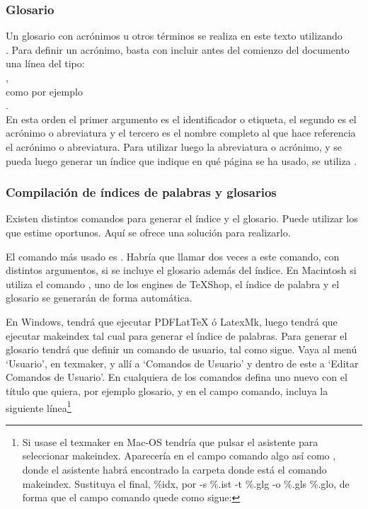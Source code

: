 \subsubsection{Glosario}
Un glosario con acrónimos u otros términos se realiza en este texto utilizando\\
 . 
 Para definir un acrónimo, basta con incluir antes del comienzo del documento una línea del tipo:\\
 , 
 \\
 como por ejemplo\\
 . 
 \\
 En esta orden el primer argumento es el identificador o etiqueta, el segundo es el acrónimo o abreviatura y el tercero es el nombre completo al que hace referencia el acrónimo o abreviatura. Para utilizar luego la abreviatura o acrónimo, y se pueda luego generar un índice que indique en qué página se ha usado, se utiliza . 

\subsubsection{Compilación de índices de palabras y glosarios}
Existen distintos comandos para generar el índice y el glosario. Puede utilizar los que estime oportunos. Aquí se ofrece una solución para realizarlo.

El comando más usado es . Habría que llamar dos veces a este comando, con distintos argumentos, si se incluye el glosario además del índice. En Macintosh si utiliza el comando , uno de los engines de TeXShop, el índice de palabra y el glosario se generarán de forma automática. 

En Windows, tendrá que ejecutar PDFLatTeX ó LatexMk, luego tendrá que ejecutar makeindex tal cual para generar el índice de palabras. Para generar el glosario tendrá que definir un comando de usuario, tal como sigue. Vaya al menú `Usuario', en texmaker, y allí a `Comandos de Usuario' y dentro de este a `Editar Comandos de Usuario'. En cualquiera de los comandos defina uno nuevo con el título que quiera, por ejemplo glosario, y en el campo comando, incluya la siguiente línea\footnote{Si usase el texmaker en Mac-OS tendría que pulsar el asistente para seleccionar makeindex. Aparecería en el campo comando algo así como , donde el asistente habrá encontrado la carpeta donde está el comando makeindex. Sustituya el final, \%idx, por  -s \%.ist -t \%.glg -o \%.gls \%.glo, de forma que el campo comando quede como sigue:
 }

